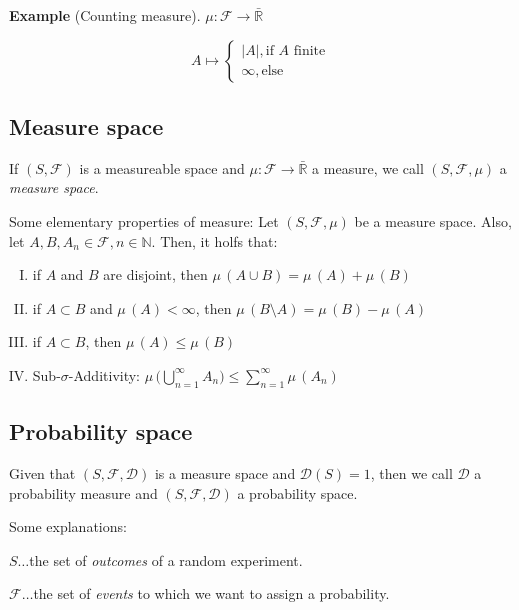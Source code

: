 \documentclass{scrarticle}
\begin{document}
\vspace{0.3cm}

\textbf{Example} (Counting measure). $\mu: \mathcal{F} \to \bar{\mathbb{R}}$

\begin{equation*}
    A \mapsto \begin{cases} |A|, \text{if } A \text{ finite} \\ \infty, \text{else} \end{cases}
\end{equation*}

\subsection{Measure space}

If $(S,\mathcal{F})$ is a measureable space and $\mu: \mathcal{F}\to \bar{\mathbb{R}}$ a measure, we call $(S, \mathcal{F}, \mu)$ a \textit{measure space}.

Some elementary properties of measure: Let $(S, \mathcal{F}, \mu)$ be a measure space. Also, let $A, B, A_n \in \mathcal{F}, n \in \mathbb{N}$. Then, it holfs that: 

\begin{enumerate}[I.]
    \item if $A$ and $B$ are disjoint, then $\mu\,(A \cup B) = \mu\,(A) + \mu\,(B)$
    \item if $A \subset B$ and $\mu\,(A) < \infty$, then $\mu \,(B \setminus A) = \mu\,(B) - \mu\,(A)$
    \item if $A \subset B$, then $\mu\,(A) \leq \mu\, (B)$
    \item Sub-$\sigma$-Additivity: $\mu\,\big( \bigcup_{n=1}^\infty A_n\big) \leq \sum_{n=1}^\infty \mu\,(A_n)$
\end{enumerate}

\subsection{Probability space}

Given that $(S,\mathcal{F}, \mathcal{D})$ is a measure space and $\mathcal{D}(S)=1$, then we call $\mathcal{D}$ a probability measure and $(S, \mathcal{F}, \mathcal{D})$ a probability space. 

Some explanations: 

$S \ldots$the set of \textit{outcomes} of a random experiment.

$\mathcal{F}\ldots$the set of \textit{events} to which we want to assign a probability.
\end{document}
